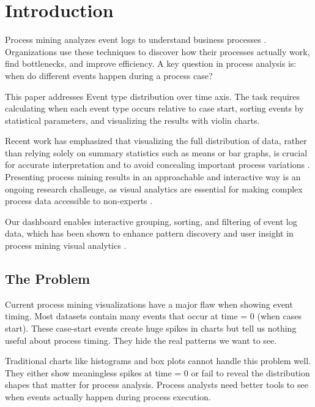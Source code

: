 
\section{Introduction}
\label{sec:introduction}

Process mining analyzes event logs to understand business processes \cite{aalst2016process}. Organizations use these techniques to discover how their processes actually work, find bottlenecks, and improve efficiency. A key question in process analysis is: when do different events happen during a process case?

This paper addresses Event type distribution over time axis. The task requires calculating when each event type occurs relative to case start, sorting events by statistical parameters, and visualizing the results with violin charts.

Recent work has emphasized that visualizing the full distribution of data, rather than relying solely on summary statistics such as means or bar graphs, is crucial for accurate interpretation and to avoid concealing important process variations \cite{weissgerber2015beyond}. Presenting process mining results in an approachable and interactive way is an ongoing research challenge, as visual analytics are essential for making complex process data accessible to non-experts \cite{rehse2023visual}.

Our dashboard enables interactive grouping, sorting, and filtering of event log data, which has been shown to enhance pattern discovery and user insight in process mining visual analytics \cite{fehrer2025interactive}.

\subsection{The Problem}
\label{subsec:problem}

Current process mining visualizations have a major flaw when showing event timing. Most datasets contain many events that occur at time = 0 (when cases start). These case-start events create huge spikes in charts but tell us nothing useful about process timing. They hide the real patterns we want to see.

Traditional charts like histograms and box plots cannot handle this problem well. They either show meaningless spikes at time = 0 or fail to reveal the distribution shapes that matter for process analysis. Process analysts need better tools to see when events actually happen during process execution.

